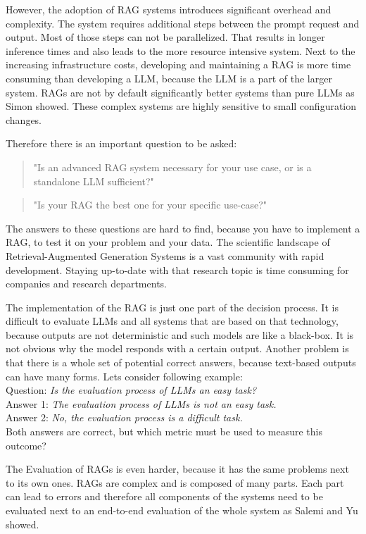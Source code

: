 However, the adoption of RAG systems introduces significant overhead and complexity. The system requires additional steps between the prompt request and output. Most of those steps can not be parallelized. That results in longer inference times and also leads to the more resource intensive system. Next to the increasing infrastructure costs, developing and maintaining a RAG is more time consuming than developing a LLM, because the LLM is a part of the larger system. RAGs are not by default significantly better systems than pure LLMs as Simon \cite{Simon.10112024} showed. These complex systems are highly sensitive to small configuration changes.

Therefore there is an important question to be asked: 
\begin{quotation}
    "Is an advanced RAG system necessary for your use case, or is a standalone LLM sufficient?"
\end{quotation}
\begin{quotation}
    "Is your RAG the best one for your specific use-case?"
\end{quotation}

The answers to these questions are hard to find, because you have to implement a RAG, to test it on your problem and your data. The scientific landscape of Retrieval-Augmented Generation Systems is a vast community with rapid development. Staying up-to-date with that research topic is time consuming for companies and research departments. 

The implementation of the RAG is just one part of the decision process. It is difficult to evaluate LLMs and all systems that are based on that technology, because outputs are not deterministic and such models are like a black-box. It is not obvious why the model responds with a certain output. Another problem is that there is a whole set of potential correct answers, because text-based outputs can have many forms. Lets consider following example:\\

Question: \textit{Is the evaluation process of LLMs an easy task?}\\
Answer 1: \textit{The evaluation process of LLMs is not an easy task.}\\
Answer 2: \textit{No, the evaluation process is a difficult task.}\\[6pt]

Both answers are correct, but which metric must be used to measure this outcome? 

The Evaluation of RAGs is even harder, because it has the same problems next to its own ones. RAGs are complex and is composed of many parts. Each part can lead to errors and therefore all components of the systems need to be evaluated next to an end-to-end evaluation of the whole system as Salemi \cite{Salemi.2024} and Yu \cite{Yu.2024} showed.

